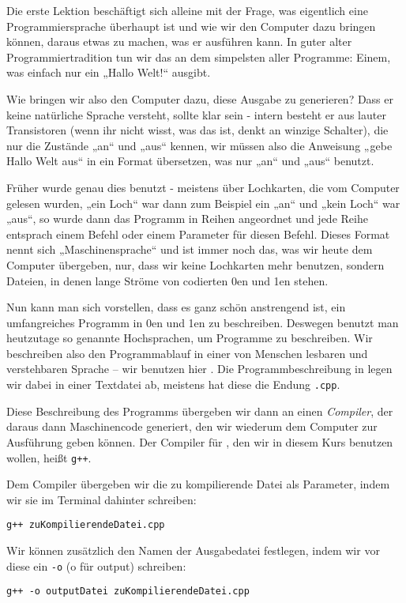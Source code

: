 
Die erste Lektion beschäftigt sich alleine mit der Frage, was eigentlich eine
Programmiersprache überhaupt ist und wie wir den Computer dazu bringen können,
daraus etwas zu machen, was er ausführen kann.  In guter alter
Programmiertradition tun wir das an dem simpelsten aller Programme: Einem, was
einfach nur ein „Hallo Welt!“ ausgibt.

Wie bringen wir also den Computer dazu, diese Ausgabe zu generieren? Dass er
keine natürliche Sprache versteht, sollte klar sein - intern besteht er aus
lauter Transistoren (wenn ihr nicht wisst, was das ist, denkt an winzige
Schalter), die nur die Zustände „an“ und „aus“ kennen, wir müssen also die
Anweisung „gebe Hallo Welt aus“ in ein Format übersetzen, was nur „an“ und
„aus“ benutzt.

Früher wurde genau dies benutzt - meistens über Lochkarten, die vom Computer
gelesen wurden, „ein Loch“ war dann zum Beispiel ein „an“ und „kein Loch“ war
„aus“, so wurde dann das Programm in Reihen angeordnet und jede Reihe entsprach
einem Befehl oder einem Parameter für diesen Befehl.  Dieses Format nennt sich
„Maschinensprache“ und ist immer noch das, was wir heute dem Computer
übergeben, nur, dass wir keine Lochkarten mehr benutzen, sondern Dateien, in
denen lange Ströme von codierten 0en und 1en stehen.

Nun kann man sich vorstellen, dass es ganz schön anstrengend ist, ein
umfangreiches Programm in 0en und 1en zu beschreiben. Deswegen benutzt man
heutzutage so genannte Hochsprachen, um Programme zu beschreiben. Wir
beschreiben also den Programmablauf in einer von Menschen lesbaren und
verstehbaren Sprache -- wir benutzen hier \Cpp.  Die Programmbeschreibung in
\Cpp legen wir dabei in einer Textdatei ab, meistens hat diese die Endung
\texttt{.cpp}.

Diese Beschreibung des Programms übergeben wir dann an einen \emph{Compiler},
der daraus dann Maschinencode generiert, den wir wiederum dem Computer zur
Ausführung geben können.  Der Compiler für \Cpp, den wir in diesem Kurs
benutzen wollen, heißt \texttt{g++}.

Dem Compiler übergeben wir die zu kompilierende Datei als Parameter, indem wir
sie im Terminal dahinter schreiben:
\begin{center}
\texttt{g++ zuKompilierendeDatei.cpp}
\end{center}
Wir können zusätzlich den Namen der Ausgabedatei festlegen, indem wir vor diese
ein \texttt{-o} (o für output) schreiben:
\begin{center}
\texttt{g++ -o outputDatei zuKompilierendeDatei.cpp}
\end{center}

